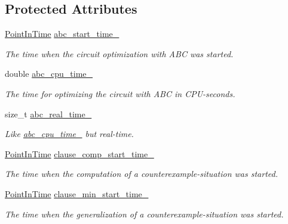 \subsection*{Protected Attributes}
\begin{DoxyCompactItemize}
\item 
\hyperlink{Options_8h_af3a9f634f27bed7e98dbc23e5c6f807d}{Point\-In\-Time} \hyperlink{classLearningExtractorStatistics_ac16b676d2eb3fe71af340233a37a9ca9}{abc\-\_\-start\-\_\-time\-\_\-}
\begin{DoxyCompactList}\small\item\em The time when the circuit optimization with A\-B\-C was started. \end{DoxyCompactList}\item 
double \hyperlink{classLearningExtractorStatistics_a58056982bf57dbe69cff268d9a9d4a32}{abc\-\_\-cpu\-\_\-time\-\_\-}
\begin{DoxyCompactList}\small\item\em The time for optimizing the circuit with A\-B\-C in C\-P\-U-\/seconds. \end{DoxyCompactList}\item 
size\-\_\-t \hyperlink{classLearningExtractorStatistics_a4bdc0c5fba7ef60dbf974f212b4b1f17}{abc\-\_\-real\-\_\-time\-\_\-}
\begin{DoxyCompactList}\small\item\em Like \hyperlink{classLearningExtractorStatistics_a58056982bf57dbe69cff268d9a9d4a32}{abc\-\_\-cpu\-\_\-time\-\_\-} but real-\/time. \end{DoxyCompactList}\item 
\hyperlink{Options_8h_af3a9f634f27bed7e98dbc23e5c6f807d}{Point\-In\-Time} \hyperlink{classLearningExtractorStatistics_a476eba034e9e2004d0fe0b2bdeafbd1e}{clause\-\_\-comp\-\_\-start\-\_\-time\-\_\-}
\begin{DoxyCompactList}\small\item\em The time when the computation of a counterexample-\/situation was started. \end{DoxyCompactList}\item 
\hyperlink{Options_8h_af3a9f634f27bed7e98dbc23e5c6f807d}{Point\-In\-Time} \hyperlink{classLearningExtractorStatistics_aad8e031085a746b5fc30b8185bf5dabf}{clause\-\_\-min\-\_\-start\-\_\-time\-\_\-}
\begin{DoxyCompactList}\small\item\em The time when the generalization of a counterexample-\/situation was started. \end{DoxyCompactList}\item 

\end{DoxyCompactItemize}
